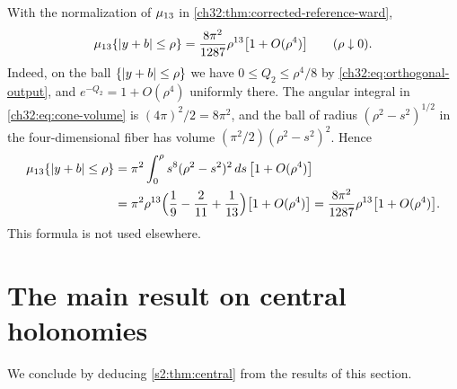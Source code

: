 \begin{remark}\label{ch32:rem:bundle-small-ball}
With the normalization of $\mu_{13}$ in \cref{ch32:thm:corrected-reference-ward},
\[
 \mu_{13}\{\lvert y+b\rvert\le\rho\}=\frac{8\pi^2}{1287}\rho^{13}\bigl[1+O(\rho^4)\bigr]\qquad(\rho\downarrow0).
\]
Indeed, on the ball $\{\lvert y+b\rvert\le\rho\}$ we have $0\le Q_2\le\rho^4/8$ by \eqref{ch32:eq:orthogonal-output}, and $e^{-Q_2}=1+O(\rho^4)$ uniformly there. The angular integral in \eqref{ch32:eq:cone-volume} is $(4\pi)^2/2=8\pi^2$, and the ball of radius $(\rho^2-s^2)^{1/2}$ in the four-dimensional fiber has volume $(\pi^2/2)(\rho^2-s^2)^2$. Hence
\[
 \begin{split}
 \mu_{13}\{\lvert y+b\rvert\le\rho\}&=\pi^2\int_0^\rho s^8(\rho^2-s^2)^2\,ds\,\bigl[1+O(\rho^4)\bigr]\\
 &=\pi^2\rho^{13}\Bigl(\frac19-\frac2{11}+\frac1{13}\Bigr)\bigl[1+O(\rho^4)\bigr]=\frac{8\pi^2}{1287}\rho^{13}\bigl[1+O(\rho^4)\bigr].
 \end{split}
\]
This formula is not used elsewhere.
\end{remark}

\section{The main result on central holonomies}\label{ch32:sec:proof-central}

We conclude by deducing \cref{s2:thm:central} from the results of this section.

